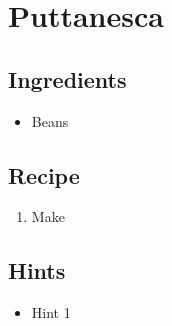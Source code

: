 \section{Puttanesca}
\subsection*{Ingredients}
\begin{itemize}
    \item Beans
\end{itemize}

\subsection*{Recipe}
\begin{enumerate}
    \item Make
\end{enumerate}

\subsection*{Hints}
\begin{itemize}
    \item Hint 1
\end{itemize}
\newpage